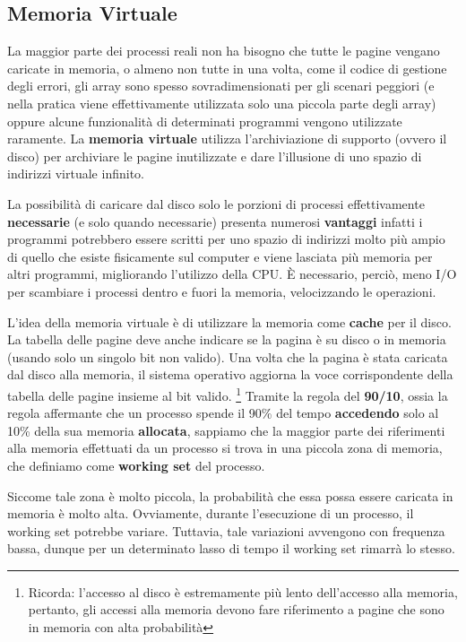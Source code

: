 \documentclass{article}
\begin{document}
\pagebreak
\subsection{Memoria Virtuale}

La maggior parte dei processi reali non ha bisogno che tutte le pagine vengano caricate in memoria, o almeno non tutte in una volta, come il codice di gestione degli errori, gli array sono spesso sovradimensionati per gli scenari peggiori (e nella pratica viene effettivamente utilizzata solo una piccola parte degli array) oppure alcune funzionalità di determinati programmi vengono utilizzate raramente.
La \textbf{memoria virtuale} utilizza l'archiviazione di supporto (ovvero il disco) per archiviare le pagine inutilizzate e dare l'illusione di uno spazio di indirizzi virtuale infinito.\par
La possibilità di caricare dal disco solo le porzioni di processi effettivamente \textbf{necessarie} (e solo quando necessarie) presenta numerosi \textbf{vantaggi} infatti i programmi potrebbero essere scritti per uno spazio di indirizzi molto più ampio di quello che esiste fisicamente sul computer e viene lasciata più memoria per altri programmi, migliorando l'utilizzo della CPU. È necessario, perciò, meno I/O per scambiare i processi dentro e fuori la memoria, velocizzando le operazioni. \par
L'idea della memoria virtuale è di utilizzare la memoria come \textbf{cache} per il disco. La tabella delle pagine deve anche indicare se la pagina è su disco o in memoria (usando solo un singolo bit non valido). Una volta che la pagina è stata caricata dal disco alla memoria, il sistema operativo aggiorna la voce corrispondente della tabella delle pagine insieme al bit valido. \footnote{Ricorda: l'accesso al disco è estremamente più lento dell'accesso alla memoria, pertanto, gli accessi alla memoria devono fare riferimento a pagine che sono in memoria con alta probabilità}
Tramite la regola del \textbf{90/10}, ossia la regola affermante che un processo spende il 90\% del tempo \textbf{accedendo} solo al 10\% della sua memoria \textbf{allocata}, sappiamo che la maggior parte dei riferimenti alla memoria effettuati da un processo si trova in una piccola zona di memoria, che definiamo come \textbf{working set} del processo.\par
Siccome tale zona è molto piccola, la probabilità che essa possa essere caricata in memoria è molto alta. Ovviamente, durante l'esecuzione di un processo, il working set potrebbe variare. Tuttavia, tale variazioni avvengono con frequenza bassa, dunque per un determinato lasso di tempo il working set rimarrà lo stesso.
\end{document}
